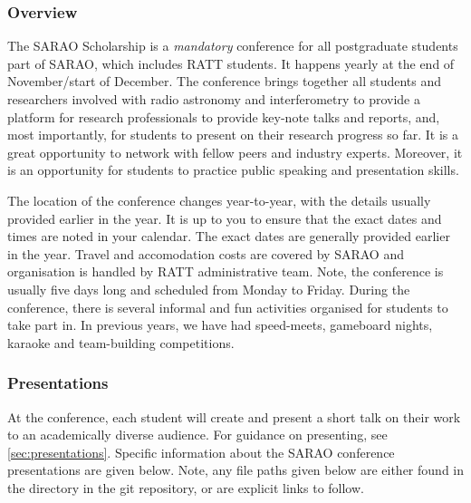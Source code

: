\documentclass[12pt]{article}
\begin{document}
    \subsubsection{Overview}\label{subsubsec:overview}
        The SARAO Scholarship is a \emph{mandatory} conference for all postgraduate students part of SARAO, which includes RATT students. It happens yearly at the end of November/start of December. The conference brings together all students and researchers involved with radio astronomy and interferometry to provide a platform for research professionals to provide key-note talks and reports, and, most importantly, for students to present on their research progress so far. It is a great opportunity to network with fellow peers and industry experts. Moreover, it is an opportunity for students to practice public speaking and presentation skills.

        The location of the conference changes year-to-year, with the details usually provided earlier in the year. It is up to you to ensure that the exact dates and times are noted in your calendar. The exact dates are generally provided earlier in the year. Travel and accomodation costs are covered by SARAO and organisation is handled by RATT administrative team. Note, the conference is usually five days long and scheduled from Monday to Friday. During the conference, there is several informal and fun activities organised for students to take part in. In previous years, we have had speed-meets, gameboard nights, karaoke and team-building competitions.


    \subsubsection{Presentations}\label{subsubsec:presentations}
        At the conference, each student will create and present a short talk on their work to an academically diverse audience. For guidance on presenting, see \cref{sec:presentations}. Specific information about the SARAO conference presentations are given below. Note, any file paths given below are either found in the  directory in the git repository, or are explicit links to follow.
\end{document}
